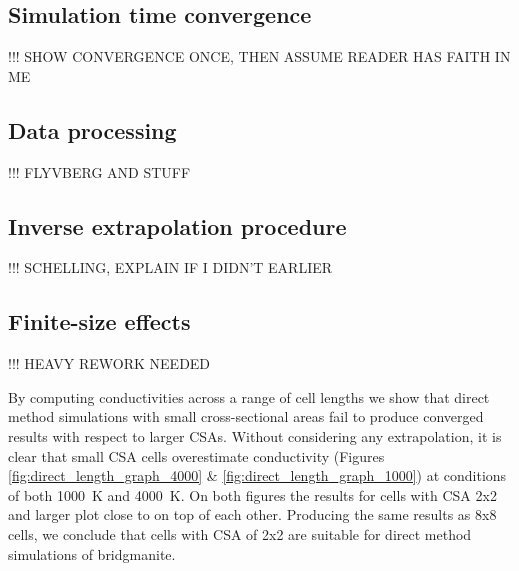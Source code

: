 \subsection{\label{sec:3.DM.time}Simulation time convergence}

!!! SHOW CONVERGENCE ONCE, THEN ASSUME READER HAS FAITH IN ME


\subsection{\label{sec:3.DM.data}Data processing}

!!! FLYVBERG AND STUFF


\subsection{\label{sec:3.DM.extrap}Inverse extrapolation procedure}

!!! SCHELLING, EXPLAIN IF I DIDN'T EARLIER


\subsection{\label{sec:3.DM.fse}Finite-size effects}

!!! HEAVY REWORK NEEDED

By computing conductivities across a range of cell lengths we show that direct method simulations with small cross-sectional areas fail to produce converged results with respect to larger CSAs. Without considering any extrapolation, it is clear that small CSA cells overestimate conductivity (Figures \ref{fig:direct_length_graph_4000} \& \ref{fig:direct_length_graph_1000}) at conditions of both 1000~K and 4000~K. On both figures the results for cells with CSA 2x2 and larger plot close to on top of each other. Producing the same results as 8x8 cells, we conclude that cells with CSA of 2x2 are suitable for direct method simulations of bridgmanite.

